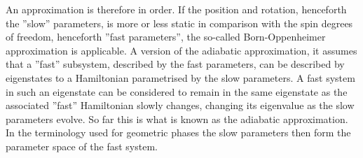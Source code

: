 \documentclass[a4paper]{article}
\begin{document}
An approximation is therefore in order. If the position and rotation,
henceforth the ''slow'' parameters,
is more or less static in comparison with the spin degrees of freedom, henceforth ''fast
parameters'', the so-called Born-Oppenheimer approximation is applicable. A version of the
adiabatic approximation, it assumes that a ''fast'' subsystem, described by the fast
parameters, can be described by eigenstates to a Hamiltonian parametrised by the slow
parameters. A fast system in such an eigenstate can be considered to remain in the same
eigenstate as the associated ''fast'' Hamiltonian slowly changes, changing its
eigenvalue as the slow parameters evolve. So far this is what is known as the adiabatic
approximation\cite{adiab}. In the terminology used for geometric phases the slow
parameters then form the parameter space of the fast system. %
\end{document}
